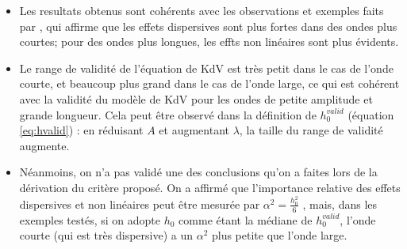 \begin{itemize}
 \item Les resultats obtenus sont cohérents avec les observations et exemples faits par \cite{conservationLaws2002}, qui affirme que les effets dispersives sont plus fortes dans des ondes plus courtes; pour des ondes plus longues, les effts non linéaires sont plus évidents.
 \item Le range de validité de l'équation de KdV est très petit dans le cas de l'onde courte, et beaucoup plus grand dans le cas de l'onde large, ce qui est cohérent avec la validité du modèle de KdV pour les ondes de petite amplitude et grande longueur. Cela peut être observé dans la définition de $h_0^{valid}$ (équation \eqref{eq:hvalid}) : en réduisant $A$ et augmentant $\lambda$, la taille du range de validité augmente.
 \item Néanmoins, on n'a pas validé une des conclusions qu'on a faites lors de la dérivation du critère proposé. On a affirmé que l'importance relative des effets dispersives et non linéaires peut être mesurée par $\alpha^2 = \frac{h_0^2}{6}$ , mais, dans les exemples testés, si on adopte $h_0$ comme étant la médiane de $ h_0^{valid} $, l'onde courte (qui est très dispersive) a un $\alpha^2$ plus petite que l'onde large.
\end{itemize} 
